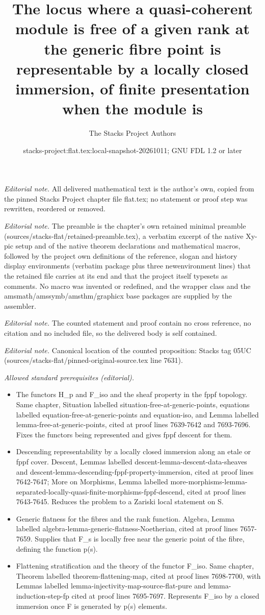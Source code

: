 \documentclass[10pt,a4paper]{amsart}
\title{The locus where a quasi-coherent module is free of a given rank at the generic fibre point is representable by a locally closed immersion, of finite presentation when the module is}
\author{The Stacks Project Authors}
\date{stacks-project:flat.tex:local-snapshot-20261011; GNU FDL 1.2 or later}
\theoremstyle{plain}
\theoremstyle{definition}
\theoremstyle{remark}
\numberwithin{equation}{subsection}
\begin{document}
\maketitle
\noindent\textit{Editorial note.} All delivered mathematical text is the author's own, copied from the pinned Stacks Project chapter file flat.tex; no statement or proof step was rewritten, reordered or removed.\par\medskip
\noindent\textit{Editorial note.} The preamble is the chapter's own retained minimal preamble (sources/stacks-flat/retained-preamble.tex), a verbatim excerpt of the native Xy-pic setup and of the native theorem declarations and mathematical macros, followed by the project own definitions of the reference, slogan and history display environments (verbatim package plus three newenvironment lines) that the retained file carries at its end and that the project itself typesets as comments. No macro was invented or redefined, and the wrapper class and the amsmath/amssymb/amsthm/graphicx base packages are supplied by the assembler.\par\medskip
\noindent\textit{Editorial note.} The counted statement and proof contain no cross reference, no citation and no included file, so the delivered body is self contained.\par\medskip
\noindent\textit{Editorial note.} Canonical location of the counted proposition: Stacks tag 05UC (sources/stacks-flat/pinned-original-source.tex line 7631).\par\medskip
\noindent\textit{Allowed standard prerequisites (editorial).}\begin{itemize}
\item The functors H\_p and F\_iso and the sheaf property in the fppf topology. Same chapter, Situation labelled situation-free-at-generic-points, equations labelled equation-free-at-generic-points and equation-iso, and Lemma labelled lemma-free-at-generic-points, cited at proof lines 7639-7642 and 7693-7696. Fixes the functors being represented and gives fppf descent for them.
\item Descending representability by a locally closed immersion along an etale or fppf cover. Descent, Lemmas labelled descent-lemma-descent-data-sheaves and descent-lemma-descending-fppf-property-immersion, cited at proof lines 7642-7647; More on Morphisms, Lemma labelled more-morphisms-lemma-separated-locally-quasi-finite-morphisms-fppf-descend, cited at proof lines 7643-7645. Reduces the problem to a Zariski local statement on S.
\item Generic flatness for the fibres and the rank function. Algebra, Lemma labelled algebra-lemma-generic-flatness-Noetherian, cited at proof lines 7657-7659. Supplies that F\_s is locally free near the generic point of the fibre, defining the function p(s).
\item Flattening stratification and the theory of the functor F\_iso. Same chapter, Theorem labelled theorem-flattening-map, cited at proof lines 7698-7700, with Lemmas labelled lemma-injectivity-map-source-flat-pure and lemma-induction-step-fp cited at proof lines 7695-7697. Represents F\_iso by a closed immersion once F is generated by p(s) elements.
\end{itemize}\medskip
\end{document}

